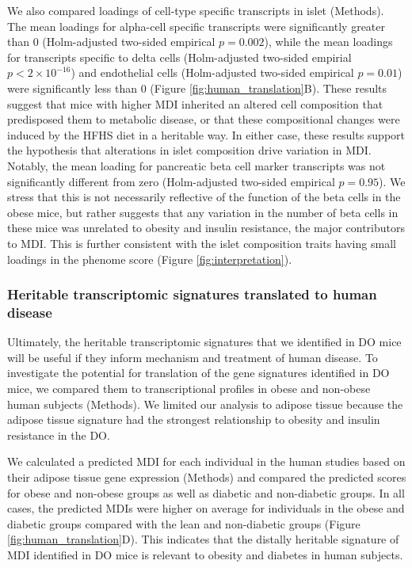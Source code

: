 \documentclass[
]{article}
\begin{document}
We also compared loadings of cell-type specific transcripts in islet
(Methods). The mean loadings for alpha-cell specific transcripts were
significantly greater than 0 (Holm-adjusted two-sided empirical
\(p = 0.002\)), while the mean loadings for transcripts specific to
delta cells (Holm-adjusted two-sided empirial \(p < 2\times10^{-16}\))
and endothelial cells (Holm-adjusted two-sided empirical \(p = 0.01\))
were significantly less than 0 (Figure \ref{fig:human_translation}B).
These results suggest that mice with higher MDI inherited an altered
cell composition that predisposed them to metabolic disease, or that
these compositional changes were induced by the HFHS diet in a heritable
way. In either case, these results support the hypothesis that
alterations in islet composition drive variation in MDI. Notably, the
mean loading for pancreatic beta cell marker transcripts was not
significantly different from zero (Holm-adjusted two-sided empirical
\(p = 0.95\)). We stress that this is not necessarily reflective of the
function of the beta cells in the obese mice, but rather suggests that
any variation in the number of beta cells in these mice was unrelated to
obesity and insulin resistance, the major contributors to MDI. This is
further consistent with the islet composition traits having small
loadings in the phenome score (Figure \ref{fig:interpretation}).

\subsubsection{Heritable transcriptomic signatures translated to human
disease}\label{heritable-transcriptomic-signatures-translated-to-human-disease}

Ultimately, the heritable transcriptomic signatures that we identified
in DO mice will be useful if they inform mechanism and treatment of
human disease. To investigate the potential for translation of the gene
signatures identified in DO mice, we compared them to transcriptional
profiles in obese and non-obese human subjects (Methods). We limited our
analysis to adipose tissue because the adipose tissue signature had the
strongest relationship to obesity and insulin resistance in the DO.

We calculated a predicted MDI for each individual in the human studies
based on their adipose tissue gene expression (Methods) and compared the
predicted scores for obese and non-obese groups as well as diabetic and
non-diabetic groups. In all cases, the predicted MDIs were higher on
average for individuals in the obese and diabetic groups compared with
the lean and non-diabetic groups (Figure \ref{fig:human_translation}D).
This indicates that the distally heritable signature of MDI identified
in DO mice is relevant to obesity and diabetes in human subjects.
\end{document}
